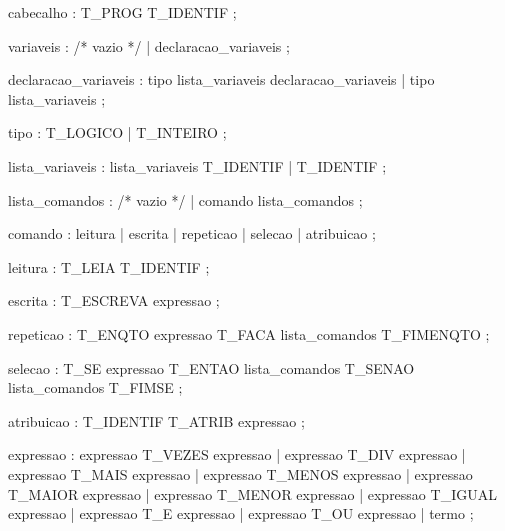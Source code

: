 \documentclass[
  brazilian,
  letterpaper,
]{book}
\newenvironment{Shaded}{\begin{snugshade}}{\end{snugshade}}
\newcommand{\CommentTok}[1]{\textcolor[rgb]{0.37,0.37,0.37}{#1}}
\newcommand{\NormalTok}[1]{\textcolor[rgb]{0.00,0.23,0.31}{#1}}
\newcommand{\OperatorTok}[1]{\textcolor[rgb]{0.37,0.37,0.37}{#1}}
\theoremstyle{plain}
\theoremstyle{definition}
\theoremstyle{remark}
\begin{document}
\begin{Shaded}
\begin{Highlighting}[]
\NormalTok{cabecalho}
    \OperatorTok{:}\NormalTok{ T\_PROG T\_IDENTIF}
    \OperatorTok{;}

\NormalTok{variaveis}
    \OperatorTok{:} \CommentTok{/* vazio */}
    \OperatorTok{|}\NormalTok{ declaracao\_variaveis}
    \OperatorTok{;}

\NormalTok{declaracao\_variaveis}
    \OperatorTok{:}\NormalTok{ tipo lista\_variaveis declaracao\_variaveis}
    \OperatorTok{|}\NormalTok{ tipo lista\_variaveis}
    \OperatorTok{;}

\NormalTok{tipo}
    \OperatorTok{:}\NormalTok{ T\_LOGICO}
    \OperatorTok{|}\NormalTok{ T\_INTEIRO}
    \OperatorTok{;}

\NormalTok{lista\_variaveis}
    \OperatorTok{:}\NormalTok{ lista\_variaveis T\_IDENTIF}
    \OperatorTok{|}\NormalTok{ T\_IDENTIF}
    \OperatorTok{;}

\NormalTok{lista\_comandos}
    \OperatorTok{:} \CommentTok{/* vazio */}
    \OperatorTok{|}\NormalTok{ comando lista\_comandos}
    \OperatorTok{;}

\NormalTok{comando}
    \OperatorTok{:}\NormalTok{ leitura}
    \OperatorTok{|}\NormalTok{ escrita}
    \OperatorTok{|}\NormalTok{ repeticao}
    \OperatorTok{|}\NormalTok{ selecao}
    \OperatorTok{|}\NormalTok{ atribuicao}
    \OperatorTok{;}

\NormalTok{leitura}
    \OperatorTok{:}\NormalTok{ T\_LEIA T\_IDENTIF}
    \OperatorTok{;}

\NormalTok{escrita}
    \OperatorTok{:}\NormalTok{ T\_ESCREVA expressao}
    \OperatorTok{;}

\NormalTok{repeticao}
    \OperatorTok{:}\NormalTok{ T\_ENQTO expressao T\_FACA }
\NormalTok{      lista\_comandos T\_FIMENQTO}
    \OperatorTok{;}

\NormalTok{selecao}
    \OperatorTok{:}\NormalTok{ T\_SE expressao T\_ENTAO }
\NormalTok{      lista\_comandos T\_SENAO }
\NormalTok{      lista\_comandos T\_FIMSE}
    \OperatorTok{;}

\NormalTok{atribuicao}
    \OperatorTok{:}\NormalTok{ T\_IDENTIF T\_ATRIB expressao}
    \OperatorTok{;}

\NormalTok{expressao}
    \OperatorTok{:}\NormalTok{ expressao T\_VEZES expressao}
    \OperatorTok{|}\NormalTok{ expressao T\_DIV expressao}
    \OperatorTok{|}\NormalTok{ expressao T\_MAIS expressao}
    \OperatorTok{|}\NormalTok{ expressao T\_MENOS expressao}
    \OperatorTok{|}\NormalTok{ expressao T\_MAIOR expressao}
    \OperatorTok{|}\NormalTok{ expressao T\_MENOR expressao}
    \OperatorTok{|}\NormalTok{ expressao T\_IGUAL expressao}
    \OperatorTok{|}\NormalTok{ expressao T\_E expressao}
    \OperatorTok{|}\NormalTok{ expressao T\_OU expressao}
    \OperatorTok{|}\NormalTok{ termo}
    \OperatorTok{;}


\end{Highlighting}
\end{Shaded}
\end{document}
